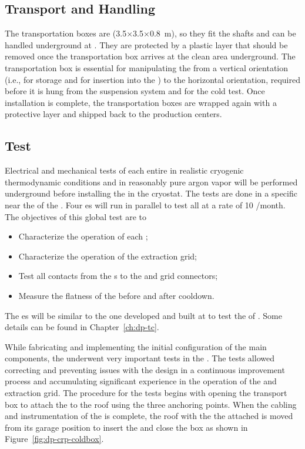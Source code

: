 \subsection{Transport and Handling}
 \label{sec:dp-crp-transport-hand}
 
The transportation boxes are (\num{3.5}$\times$\num{3.5}$\times$\SI{0.8}{m}), so they fit the shafts and can be handled underground at .
They are protected by a plastic layer that should be removed once the transportation box arrives at the clean area 
underground. The transportation box is essential for manipulating the  from a vertical orientation (i.e., for storage and for insertion into the ) to the horizontal orientation, required 
 before it is hung from the suspension system and for the cold test. Once installation is complete, the transportation boxes are wrapped again with a protective layer and shipped back to the production centers. 

\subsection{\Coldbox Test}
 \label{sec:dp-crp-coldboxtest}
Electrical and mechanical tests of each entire  in realistic cryogenic thermodynamic conditions and in reasonably pure argon vapor will be performed underground  before installing the  in the cryostat. The tests are done in a  specific \coldbox near the  of the . Four \coldbox{}es will run in parallel to test  all  at a rate of \num{10} /month.
The objectives of this global  test are to
\begin{itemize}
\item Characterize the  operation of each ;
\item Characterize the  operation of the extraction grid;
\item Test all  contacts from the \fdth{}s to the  and grid connectors;
\item Measure the flatness of the  before and after cooldown.
\end{itemize}
The \coldbox{}es will be similar to the one developed and built at   to test the  of . Some details can be found in Chapter~\ref{ch:dp-tc}. 

While fabricating and  implementing the initial configuration of the main components, the   underwent very important tests in
the \coldbox. The \coldbox tests allowed correcting and preventing issues with the  design in a continuous improvement process and accumulating significant  experience in the  operation of the  and extraction grid.
The procedure for the tests begins with opening the transport box to attach the  to the \coldbox roof using the three anchoring points.
 When the cabling and instrumentation of the  is complete,  the \coldbox roof with the the  attached is moved from its garage position to insert the  and close the box as shown in Figure~\ref{fig:dp-crp-coldbox}. 
 
